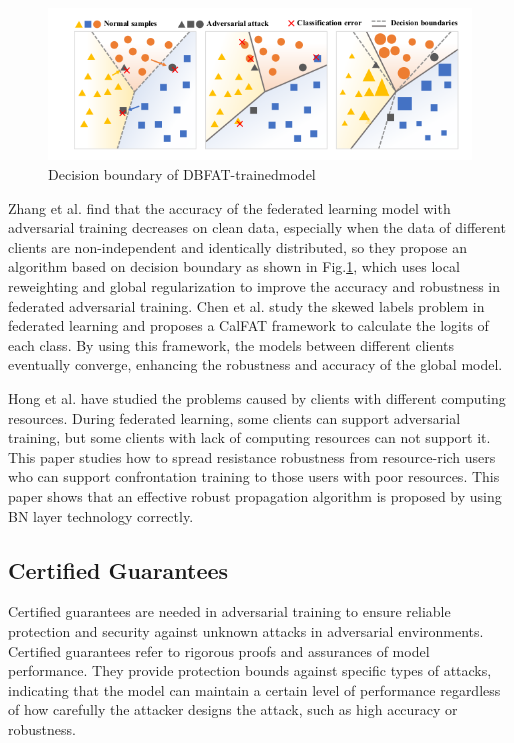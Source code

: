\documentclass[conference]{IEEEtran}
\begin{document}
\begin{figure}[htbp]
    \centerline{\includegraphics[width=1.0\linewidth,height=0.4\linewidth]{picture/db.png}}
    \caption{Decision boundary of DBFAT-trainedmodel}
    \label{fig19}
\end{figure}

Zhang et al.\cite{b34} find that the accuracy of the federated learning model with
adversarial training decreases on clean data, especially when the data of different
clients are non-independent and identically distributed, so they propose an algorithm
based on decision boundary as shown in Fig.\ref{fig19}, which uses local reweighting and global regularization
to improve the accuracy and robustness in federated adversarial training.
Chen et al.\cite{b32} study the skewed labels problem in federated learning and proposes
a CalFAT framework to calculate the logits of each class. By using this framework, the models between different clients eventually converge, 
enhancing the robustness and accuracy of the global model.

Hong et al.\cite{b105} have studied the problems caused by clients with different computing resources.
During federated learning, some clients can support adversarial training, but some clients with
lack of computing resources can not support it. This paper studies how to spread resistance robustness
from resource-rich users who can support confrontation training to those users with poor resources.
This paper shows that an effective robust propagation algorithm is proposed by using BN layer technology correctly.  

\subsection{Certified Guarantees}  
Certified guarantees are needed in adversarial training to ensure reliable protection and security against unknown attacks in adversarial environments.
Certified guarantees refer to rigorous proofs and assurances of model performance. 
They provide protection bounds against specific types of attacks, 
indicating that the model can maintain a certain level of performance regardless of how carefully the attacker designs the attack, such as high accuracy or robustness.
\end{document}

